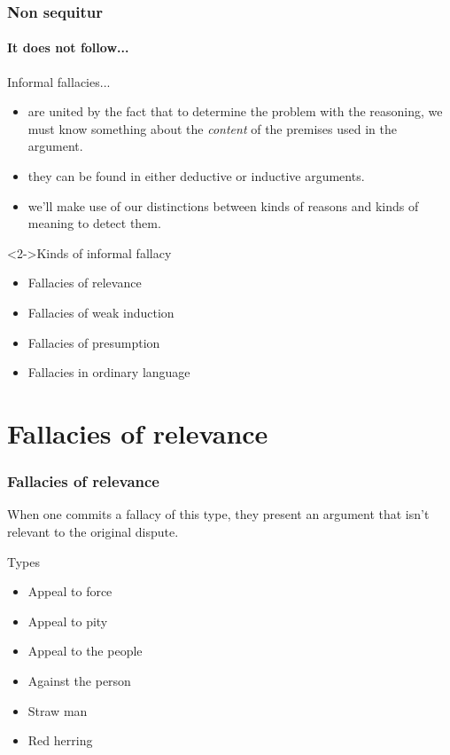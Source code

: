 \documentclass[10pt,letterpaper,xcolor=dvipsnames,handout]{beamer}
\begin{document}
\begin{frame}
\frametitle{Non sequitur}
\framesubtitle{It does not follow...}

\begin{block}{Informal fallacies...}
  \begin{itemize}
    \item are united by the fact that to determine the problem with the reasoning, we must know something about the \textit{content} of the premises used in the argument.
    \item they can be found in either deductive or inductive arguments.
    \item we'll make use of our distinctions between kinds of reasons and kinds of meaning to detect them.
  \end{itemize}
\end{block}
   
\begin{block}<2->{Kinds of informal fallacy}
  \begin{itemize}
    \item Fallacies of relevance
    \item Fallacies of weak induction
    \item Fallacies of presumption
    \item Fallacies in ordinary language
  \end{itemize}
\end{block}

\end{frame}

\section{Fallacies of relevance}

\begin{frame}
\frametitle{Fallacies of relevance}

When one commits a fallacy of this type, they present an argument that isn't relevant to the original dispute.

\begin{block}{Types}
  \begin{itemize}
    \item Appeal to force
    \item Appeal to pity
    \item Appeal to the people
    \item Against the person
    \item Straw man
    \item Red herring
  \end{itemize}
\end{block}

\end{frame}
\end{document}
